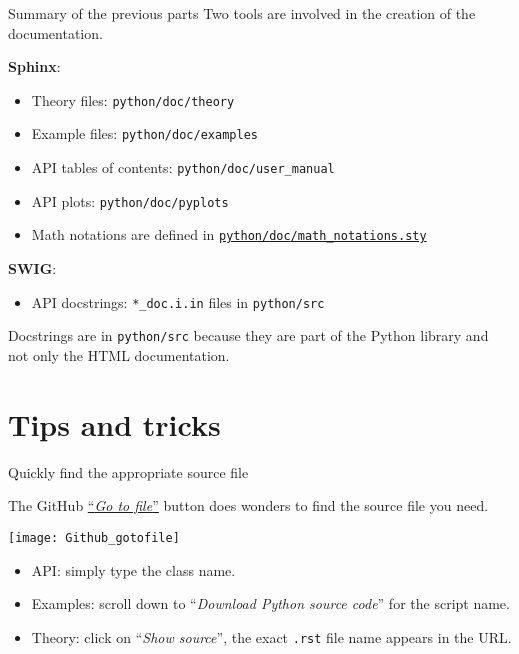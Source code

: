 \documentclass[8pt, handout]{beamer}
\begin{document}
\begin{frame}{Summary of the previous parts}
Two tools are involved in the creation of the documentation.

\textbf{Sphinx}:
\begin{itemize}
    \item Theory files: \texttt{python/\alert{doc}/theory}
    \item Example files: \texttt{python/\alert{doc}/examples}
    \item API tables of contents: \texttt{python/\alert{doc}/user\_manual}
    \item API plots: \texttt{python/\alert{doc}/pyplots}
    \item Math notations are defined in \href{https://github.com/openturns/openturns/blob/master/python/doc/math_notations.sty}{\texttt{python/\alert{doc}/math\_notations.sty}}
\end{itemize}

\textbf{SWIG}:
\begin{itemize}
    \item API docstrings: \texttt{*\_doc.i.in} files in \texttt{python/\alert{src}}
\end{itemize}

Docstrings are in \texttt{python/\alert{src}} because they are part of the Python library and not only the HTML documentation.

\end{frame}



\section{Tips and tricks}



\begin{frame}{Quickly find the appropriate source file}

The GitHub \href{https://github.com/openturns/openturns/find/master}{``\alert{\emph{Go to file}}''} button does wonders to find the source file you need.

\texttt{[image: Github\_gotofile]}

\begin{itemize}
    \item API: simply type the class name.
    \item Examples: scroll down to ``\alert{\emph{Download Python source code}}'' for the script name.
    \item Theory: click on ``\alert{\emph{Show source}}'', the exact \texttt{.rst} file name appears in the URL.
\end{itemize}

\end{frame}
\end{document}
